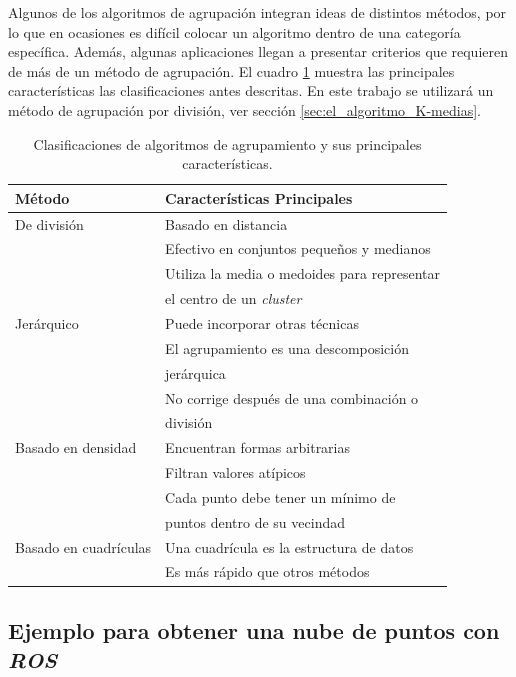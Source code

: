 Algunos de los algoritmos de agrupación integran ideas de distintos métodos, por lo que en ocasiones es difícil colocar un algoritmo dentro de una categoría específica. Además, algunas aplicaciones llegan a presentar criterios que requieren de más de un método de agrupación. El cuadro \ref{tab:clustering_methods} muestra las principales características las clasificaciones antes descritas. En este trabajo se utilizará un método de agrupación por división, ver sección \ref{sec:el_algoritmo_K-medias}.
\begin{table}[t]
    \begin{center}
    \begin{tabular}{| l | l |}
    \hline
    Método & Características Principales \\ \hline
    De división & Basado en distancia \\ & Efectivo en conjuntos pequeños y medianos \\ & Utiliza la media o medoides para representar \\ & el centro de un \textit{cluster}  \\ \hline
    Jerárquico & Puede incorporar otras técnicas \\ & El agrupamiento es una descomposición \\ & jerárquica \\ & No corrige después de una combinación o \\ & división \\ \hline
    Basado en densidad  & Encuentran formas arbitrarias \\ & Filtran valores atípicos  \\ & Cada punto debe tener un mínimo de \\ & puntos dentro de su vecindad \\ \hline
    Basado en cuadrículas & Una cuadrícula es la estructura de datos \\ & Es más rápido que otros métodos \\ \hline
\end{tabular}
    \end{center}
    \caption{Clasificaciones de algoritmos de agrupamiento y sus principales características.}
    \label{tab:clustering_methods}
\end{table}

\subsection{Ejemplo para obtener una nube de puntos con \textit{ROS}} \label{sub:ejemplo_para_obtener_una nube_de_puntos_con_ROS}

